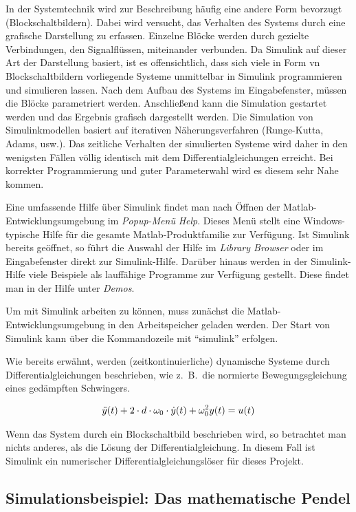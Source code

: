 In der Systemtechnik wird zur Beschreibung häufig eine andere Form bevorzugt (Blockschaltbildern).
Dabei wird versucht, das Verhalten des Systems durch eine grafische Darstellung zu erfassen.
Einzelne Blöcke werden durch gezielte Verbindungen, den Signalflüssen, miteinander verbunden.
Da Simulink auf dieser Art der Darstellung basiert, ist es offensichtlich, dass sich viele in Form vn Blockschaltbildern vorliegende Systeme unmittelbar in Simulink programmieren und simulieren lassen.
Nach dem Aufbau des Systems im Eingabefenster, müssen die Blöcke parametriert werden.
Anschließend kann die Simulation gestartet werden und das Ergebnis grafisch dargestellt werden.
Die Simulation von Simulinkmodellen basiert auf iterativen Näherungsverfahren (Runge-Kutta, Adams, usw.).
Das zeitliche Verhalten der simulierten Systeme wird daher in den wenigsten Fällen völlig identisch mit dem Differentialgleichungen erreicht.
Bei korrekter Programmierung und guter Parameterwahl wird es diesem sehr Nahe kommen.

Eine umfassende Hilfe über Simulink findet man nach Öffnen der Matlab-Entwicklungsumgebung im \emph{Popup-Menü} \emph{Help}.
Dieses Menü stellt eine Windows-typische Hilfe für die gesamte Matlab-Produktfamilie zur Verfügung.
Ist Simulink bereits geöffnet, so führt die Auswahl der Hilfe im \emph{Library Browser} oder im Eingabefenster direkt zur Simulink-Hilfe.
Darüber hinaus werden in der Simulink-Hilfe viele Beispiele als lauffähige Programme zur Verfügung gestellt.
Diese findet man in der Hilfe unter \emph{Demos}.

Um mit Simulink arbeiten zu können, muss zunächst die Matlab-Entwicklungsumgebung in den Arbeitspeicher geladen werden.
Der Start von Simulink kann über die Kommandozeile mit \enquote{simulink} erfolgen.

Wie bereits erwähnt, werden (zeitkontinuierliche) dynamische Systeme durch Differentialgleichungen beschrieben, wie z.\ B.\ die normierte Bewegungsgleichung eines gedämpften Schwingers.

\begin{align*}
	\ddot{y}(t) + 2\cdot d\cdot \omega_{\mathrm{0}}\cdot \dot{y}(t) + \omega_{\mathrm{0}}^{2} y(t) = u(t)
\end{align*}

Wenn das System durch ein Blockschaltbild beschrieben wird, so betrachtet man nichts anderes, als die Lösung der Differentialgleichung.
In diesem Fall ist Simulink ein numerischer Differentialgleichungslöser für dieses Projekt.

\subsection{Simulationsbeispiel: Das mathematische Pendel}


